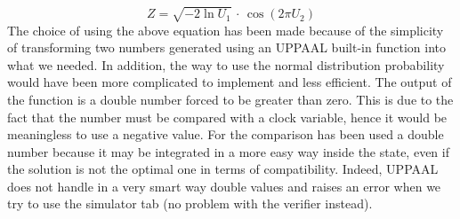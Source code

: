 \documentclass{article}
\begin{document}
			\begin{equation}
				Z = \sqrt{-2\ln{U_1}}\,\cdot\,\cos{(2\pi U_2)}
			\end{equation}
			The choice of using the above equation has been made because of the simplicity of transforming two numbers generated using an UPPAAL built-in function into what we needed. In addition, the way to use the normal distribution probability would have been more complicated to implement and less efficient. The output of the function is a double number forced to be greater than zero. This is due to the fact that the number must be compared with a clock variable, hence it would be meaningless to use a negative value. For the comparison has been used a double number because it may be integrated in a more easy way inside the state, even if the solution is not the optimal one in terms of compatibility. Indeed, UPPAAL does not handle in a very smart way double values and raises an error when we try to use the simulator tab (no problem with the verifier instead).
			
\end{document}
